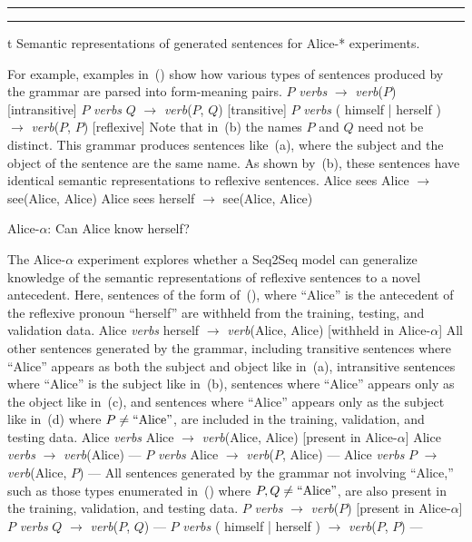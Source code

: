 \par\nobreak\medskip
\hrule width 5.5in
\smallskip
{}
\smallskip
\hrule width 5.5in
\par\nobreak\medskip
\caption/t Semantic representations of generated sentences for Alice-* experiments.

For example, examples in~(\nextx) show how various types of sentences produced 
by the grammar are parsed into form-meaning pairs.
\pex
	\a $P$ {\em verbs} $\to$ {\em verb}($P$) \hfill [intransitive]
	\a $P$ {\em verbs} $Q$ $\to$ {\em verb}($P$, $Q$) \hfill [transitive]
	\a $P$ {\em verbs} ( himself | herself ) $\to$ {\em verb}($P$, $P$) \hfill [reflexive]
\xe
Note that in~(\lastx b) the names $P$ and $Q$ need not be distinct. This 
grammar produces sentences like~(\nextx a), where the subject and the object
of the sentence are the same name. As shown by~(\nextx b), these sentences have
identical semantic representations to reflexive sentences.
\pex
	\a Alice sees Alice $\to$ see(Alice, Alice)
	\a Alice sees herself $\to$ see(Alice, Alice)
\xe

\ssec Alice-$\alpha$: Can Alice know herself?

The Alice-$\alpha$ experiment explores whether a Seq2Seq model can generalize
knowledge of the semantic representations of reflexive sentences to a novel
antecedent. Here, sentences of the form of~(\nextx), where ``Alice'' is the
antecedent of the reflexive pronoun ``herself'' are withheld from the training,
testing, and validation data. 
	Alice {\em verbs} herself $\to$ {\em verb}(Alice, Alice) \hfill [withheld in Alice-$\alpha$]
\xe
All other sentences generated by the grammar, including transitive sentences 
where ``Alice'' appears as both the subject and object like in~(\nextx a),
intransitive sentences where ``Alice'' is the subject like in~(\nextx b), 
sentences where ``Alice'' appears only as the object like in~(\nextx c), and
sentences where ``Alice'' appears only as the subject like in~(\nextx d) where 
$P \not= \hbox{``Alice''}$, are included in the training, validation, and 
testing data.
	\a Alice {\em verbs} Alice $\to$ {\em verb}(Alice, Alice) \hfill [present in Alice-$\alpha$]
	\a Alice {\em verbs} $\to$ {\em verb}(Alice) \hfill ---
	\a $P$ {\em verbs} Alice $\to$ {\em verb}($P$, Alice) \hfill ---
	\a Alice {\em verbs} $P$ $\to$ {\em verb}(Alice, $P$) \hfill ---
\xe
All sentences generated by the grammar not involving ``Alice,'' such as those
types enumerated in~(\nextx) where $P,Q \not= \hbox{``Alice''}$, are also present in the training, validation, and
testing data.
\pex
	\a $P$ {\em verbs} $\to$ {\em verb}($P$) \hfill [present in Alice-$\alpha$]
	\a $P$ {\em verbs} $Q$ $\to$ {\em verb}($P$, $Q$) \hfill ---
	\a $P$ {\em verbs} ( himself | herself ) $\to$ {\em verb}($P$, $P$) \hfill ---
\xe

